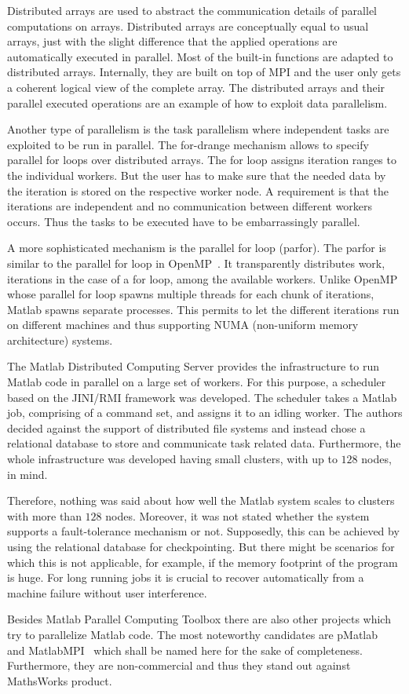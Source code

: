 Distributed arrays are used to abstract the communication details of parallel computations on arrays.
Distributed arrays are conceptually equal to usual arrays, just with the slight difference that the applied operations are automatically executed in parallel.
Most of the built-in functions are adapted to distributed arrays.
Internally, they are built on top of MPI and the user only gets a coherent logical view of the complete array.
The distributed arrays and their parallel executed operations are an example of how to exploit data parallelism.

Another type of parallelism is the task parallelism where independent tasks are exploited to be run in parallel.
The for-drange mechanism allows to specify parallel for loops over distributed arrays.
The for loop assigns iteration ranges to the individual workers.
But the user has to make sure that the needed data by the iteration is stored on the respective worker node.
A requirement is that the iterations are independent and no communication between different workers occurs.
Thus the tasks to be executed have to be embarrassingly parallel.

A more sophisticated mechanism is the parallel for loop (parfor).
The parfor is similar to the parallel for loop in OpenMP~\cite{dagum:csei1998a}.
It transparently distributes work, iterations in the case of a for loop, among the available workers.
Unlike OpenMP whose parallel for loop spawns multiple threads for each chunk of iterations, Matlab spawns separate processes.
This permits to let the different iterations run on different machines and thus supporting NUMA (non-uniform memory architecture) systems.

The Matlab Distributed Computing Server provides the infrastructure to run Matlab code in parallel on a large set of workers.
For this purpose, a scheduler based on the JINI/RMI framework was developed.
The scheduler takes a Matlab job, comprising of a command set, and assigns it to an idling worker.
The authors decided against the support of distributed file systems and instead chose a relational database to store and communicate task related data.
Furthermore, the whole infrastructure was developed having small clusters, with up to $128$ nodes, in mind.

Therefore, nothing was said about how well the Matlab system scales to clusters with more than $128$ nodes.
Moreover, it was not stated whether the system supports a fault-tolerance mechanism or not.
Supposedly, this can be achieved by using the relational database for checkpointing.
But there might be scenarios for which this is not applicable, for example, if the memory footprint of the program is huge.
For long running jobs it is crucial to recover automatically from a machine failure without user interference.

Besides Matlab Parallel Computing Toolbox there are also other projects which try to parallelize Matlab code.
The most noteworthy candidates are pMatlab~\cite{bliss:ijhpca2007a} and MatlabMPI~\cite{kepner:jpdc2004a} which shall be named here for the sake of completeness.
Furthermore, they are non-commercial and thus they stand out against MathsWorks product.
